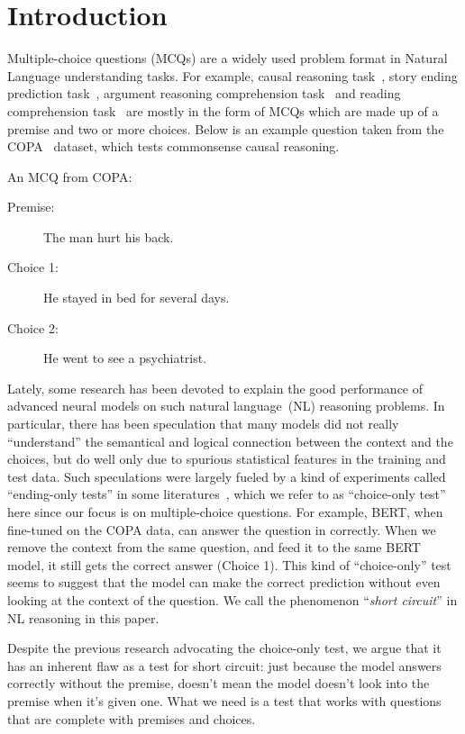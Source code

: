 \section{Introduction}
\label{sec:intro}

\iffalse
Multiple-choice questions (MCQs) are a widely used problem format 
in Natural Language understanding tasks. 
For example, causal reasoning task~\cite{copa2012}, story ending prediction task~\cite{roc2017},
argument reasoning comprehension task~\cite{arct2018} and reading comprehension task~\cite{yu2020reclor}
are mostly in the form of MCQs which are made up of a premise and 
two or more choices. Below is an example question taken 
from the COPA~\cite{copa2012} dataset, which tests commonsense causal 
reasoning.

\begin{example}\label{ex:copa}
An MCQ from COPA:
\begin{description}
\item[Premise:] The man hurt his back.
\item[Choice 1:] He stayed in bed for several days.  \Checkmark
\item[Choice 2:] He went to see a psychiatrist. \XSolidBrush
\end{description}
\end{example}

Lately, some research has been devoted to explain the good performance
of advanced neural models on such natural language~(NL) reasoning problems.
In particular, there has been speculation that many models did not
really ``understand'' the semantical and logical connection between
the context and the choices, 
but do well only due to spurious statistical features in the 
training and test data.
Such speculations were largely fueled by a kind of
experiments called ``ending-only tests'' in some literatures~\cite{endingonly1,endingonly2}, 
which we refer to as ``choice-only test'' here since our focus is 
on multiple-choice questions.
For example, BERT, when fine-tuned on the COPA data, can answer
the question in  correctly. When we remove the context from 
the same question, and feed it to the same BERT model, it still
gets the correct answer (Choice 1). This kind of ``choice-only'' 
test seems to suggest that the model can make the correct prediction
without even looking at the context of the question. 
We call the phenomenon ``\textit{short circuit}'' in NL 
reasoning in this paper.

Despite the previous research advocating the choice-only test,
we argue that it has an inherent flaw as a test for
short circuit: just because the model answers correctly without
the premise, doesn't mean the model doesn't look into the premise
when it's given one. What we need is a test that works with questions
that are complete with premises and choices.

